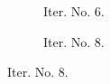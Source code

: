 \documentclass[a4paper,12pt]{amsart}
\numberwithin{equation}{section}
\begin{document}
\begin{figure}[h!]
\begin{subfigure}[t]{0.49\textwidth}
    \caption{Iter. No. 6.}
\end{subfigure}
	\hfill
\begin{subfigure}[t]{0.49\textwidth}
    \caption{Iter. No. 8.}
\end{subfigure}


\end{figure}
\end{document}
